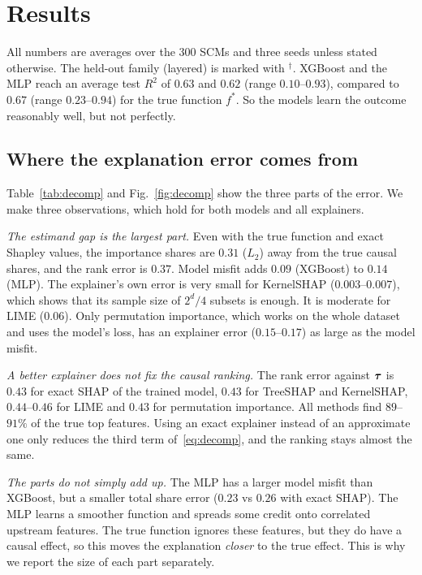 \section{Results}
All numbers are averages over the 300 SCMs and three seeds unless stated otherwise. The held-out family (layered) is marked with $^\dagger$. XGBoost and the MLP reach an average test $R^2$ of $0.63$ and $0.62$ (range $0.10$--$0.93$), compared to $0.67$ (range $0.23$--$0.94$) for the true function $f^*$. So the models learn the outcome reasonably well, but not perfectly.

\subsection{Where the explanation error comes from}
\TableDecomposition
Table~\ref{tab:decomp} and Fig.~\ref{fig:decomp} show the three parts of the error. We make three observations, which hold for both models and all explainers.

\emph{The estimand gap is the largest part.} Even with the true function and exact Shapley values, the importance shares are $0.31$ ($L_2$) away from the true causal shares, and the rank error is $0.37$. Model misfit adds $0.09$ (XGBoost) to $0.14$ (MLP). The explainer's own error is very small for KernelSHAP ($0.003$--$0.007$), which shows that its sample size of $2^d/4$ subsets is enough. It is moderate for LIME ($0.06$). Only permutation importance, which works on the whole dataset and uses the model's loss, has an explainer error ($0.15$--$0.17$) as large as the model misfit.

\emph{A better explainer does not fix the causal ranking.} The rank error against $\boldsymbol{\tau}$ is $0.43$ for exact SHAP of the trained model, $0.43$ for TreeSHAP and KernelSHAP, $0.44$--$0.46$ for LIME and $0.43$ for permutation importance. All methods find $89$--$91\%$ of the true top features. Using an exact explainer instead of an approximate one only reduces the third term of~\eqref{eq:decomp}, and the ranking stays almost the same.

\emph{The parts do not simply add up.} The MLP has a larger model misfit than XGBoost, but a smaller total share error ($0.23$ vs $0.26$ with exact SHAP). The MLP learns a smoother function and spreads some credit onto correlated upstream features. The true function ignores these features, but they do have a causal effect, so this moves the explanation \emph{closer} to the true effect. This is why we report the size of each part separately.

